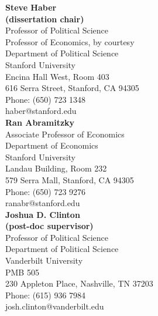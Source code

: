 \documentclass[11pt]{article}
\begin{document}
\begin{minipage}[t]{.21\textwidth}
	\text{ }
\end{minipage}
\begin{minipage}[t]{.4\textwidth}
	\textbf{Steve Haber} \\
	\textbf{(dissertation chair)} \\
	Professor of Political Science \\
	Professor of Economics, by courtesy \\
	Department of Political Science \\
	Stanford University \\
	Encina Hall West, Room 403 \\
	616 Serra Street, Stanford, CA 94305 \\
	Phone: (650) 723 1348 \\
	haber@stanford.edu \\

	\textbf{Ran Abramitzky} \\
	Associate Professor of Economics \\
	Department of Economics \\
	Stanford University \\
	Landau Building, Room 232\\
	579 Serra Mall, Stanford, CA 94305\\
	Phone: (650) 723 9276 \\
	ranabr@stanford.edu \\

	\textbf{Joshua D. Clinton} \\
	\textbf{(post-doc supervisor)} \\
	Professor of Political Science \\
	Department of Political Science \\
	Vanderbilt University \\
	PMB 505 \\
	230 Appleton Place, Nashville, TN 37203\\
	Phone: (615) 936 7984  \\
	josh.clinton@vanderbilt.edu \\
\end{minipage}
\end{document}
